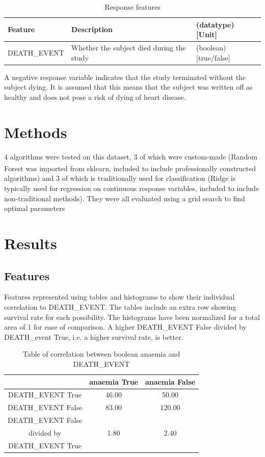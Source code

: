 \documentclass[a4paper, UKenglish]{article}
\newcommand{\0}{\mathbf{0}}
\newcommand{\1}{\mathbf{1}}
\newcommand{\citesup}[1]{\textsuperscript{\cite{#1}}}
\begin{document}
\begin{table}[H]
\centering
\caption{Response features}
\label{tab:response features}
\begin{tabular}{|l|l||l|}
    \hline
    Feature & Description & (datatype) [Unit] \\
    \hline
    \hline
    DEATH\_EVENT & Whether the subject died during the study& (boolean) [true/false] \\
    \hline
\end{tabular}
\end{table}

A negative response variable indicates that the study terminated without the subject dying. It is assumed that this means that the subject was written off as healthy and does not pose a risk of dying of heart disease.

\section{Methods}
4 algorithms were tested on this dataset, 3 of which were custom-made (Random Forest was imported from sklearn\citesup{sklearn}, included to include professionally constructed algorithms) and 3 of which is traditionally used for classification (Ridge is typically used for regression on continuous response variables, included to include non-traditional methods). They were all evaluated using a grid search to find optimal parameters


\section{Results}

\subsection{Features}
Features represented using tables and histograms to show their individual correlation to DEATH\_EVENT. The tables include an extra row showing survival rate for each possibility. The histograms have been normalized for a total area of 1 for ease of comparison. A higher DEATH\_EVENT False divided by DEATH\_event True, i.e. a higher survival rate, is better.

\begin{table}[H]
\centering
\caption{Table of correlation between boolean anaemia and DEATH\_EVENT}
\label{tab:anaemia}
\begin{tabular}{|c||c|c|}
    \hline
       & anaemia True   & anaemia False   \\
    \hline
    \hline
    DEATH{\_}EVENT True & 46.00  & 50.00 \\
    \hline
    DEATH{\_}EVENT False & 83.00 & 120.00  \\
    \hline
    \hline
    DEATH{\_}EVENT False & & \\
    divided by & 1.80 & 2.40 \\
    DEATH{\_}EVENT True & & \\
    \hline
\end{tabular}
\end{table}
\end{document}
